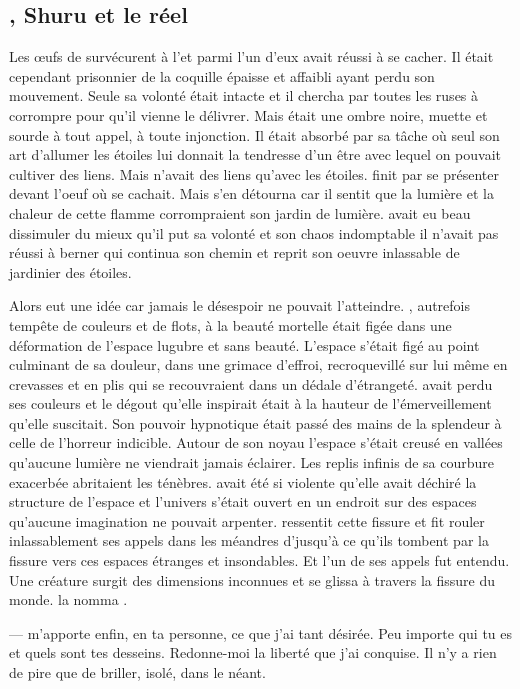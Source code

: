\subsection{\Ogo, Shuru et le réel}

Les œufs de \Tot survécurent à l'\Extinction et parmi l'un d'eux \Ogo avait réussi à se cacher. Il était cependant prisonnier de la coquille épaisse et affaibli ayant perdu son mouvement. Seule sa volonté était intacte et il chercha par toutes les ruses à corrompre \carac pour qu'il vienne le délivrer. Mais \carac était une ombre noire, muette et sourde à tout appel, à toute injonction. Il était absorbé par sa tâche où seul son art d'allumer les étoiles lui donnait la tendresse d'un être avec lequel on pouvait cultiver des liens. Mais \carac n'avait des liens qu'avec les étoiles. \carac finit par se présenter devant l'oeuf où \Ogo se cachait. Mais \carac s'en détourna car il sentit que la lumière et la chaleur de cette flamme corrompraient son jardin de lumière. \Ogo avait eu beau dissimuler du mieux qu'il put sa volonté et son chaos indomptable il n'avait pas réussi à berner \carac qui continua son chemin et reprit son oeuvre inlassable de jardinier des étoiles. 

Alors \Ogo eut une idée car jamais le désespoir ne pouvait l'atteindre. \auga, autrefois tempête de couleurs et de flots, à la beauté mortelle était figée dans une déformation de l'espace lugubre et sans beauté. L'espace s'était figé au point culminant de sa douleur, dans une grimace d'effroi, recroquevillé sur lui même en crevasses et en plis qui se recouvraient dans un dédale d'étrangeté. \auga avait perdu ses couleurs et le dégout qu'elle inspirait était à la hauteur de l'émerveillement qu'elle suscitait. Son pouvoir hypnotique était passé des mains de la splendeur à celle de l'horreur indicible. Autour de son noyau l'espace s'était creusé en vallées qu'aucune lumière ne viendrait jamais éclairer. Les replis infinis de sa courbure exacerbée abritaient les ténèbres. \auga avait été si violente qu'elle avait déchiré la structure de l'espace et l'univers s'était ouvert en un endroit sur des espaces qu'aucune imagination ne pouvait arpenter. \Ogo ressentit cette fissure et fit rouler inlassablement ses appels dans les méandres d'\auga jusqu'à ce qu'ils tombent par la fissure vers ces espaces étranges et insondables. Et l'un de ses appels fut entendu. Une créature surgit des dimensions inconnues et se glissa à travers la fissure du monde. \Ogo la nomma \Shuru.

--- \auga m'apporte enfin, en ta personne, ce que j'ai tant désirée. Peu importe qui tu es et quels sont tes desseins. Redonne-moi la liberté que j'ai conquise. Il n'y a rien de pire que de briller, isolé, dans le néant. \n

